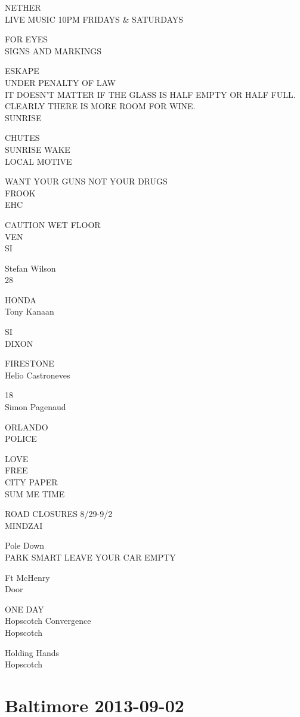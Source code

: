 \documentclass[10pt,letterpaper]{article}
\begin{document}
NETHER\\
LIVE MUSIC 10PM FRIDAYS \& SATURDAYS

FOR EYES\\
SIGNS AND MARKINGS

ESKAPE\\
UNDER PENALTY OF LAW\\
IT DOESN'T MATTER IF THE GLASS IS HALF EMPTY OR HALF FULL.  CLEARLY THERE IS MORE ROOM FOR WINE.\\
SUNRISE

CHUTES\\
SUNRISE WAKE\\
LOCAL MOTIVE

WANT YOUR GUNS NOT YOUR DRUGS\\
FROOK\\
EHC

CAUTION WET FLOOR\\
VEN\\
SI

Stefan Wilson\\
28

HONDA\\
Tony Kanaan

SI\\
DIXON

FIRESTONE\\
Helio Castroneves

18\\
Simon Pagenaud

ORLANDO\\
POLICE

LOVE\\
FREE\\
CITY PAPER\\
SUM ME TIME

ROAD CLOSURES 8/29{-}9/2\\
MINDZAI

Pole Down\\
PARK SMART LEAVE YOUR CAR EMPTY

Ft McHenry\\
Door

ONE DAY\\
Hopscotch Convergence\\
Hopscotch

Holding Hands\\
Hopscotch


\section*{Baltimore 2013-09-02}
\end{document}

